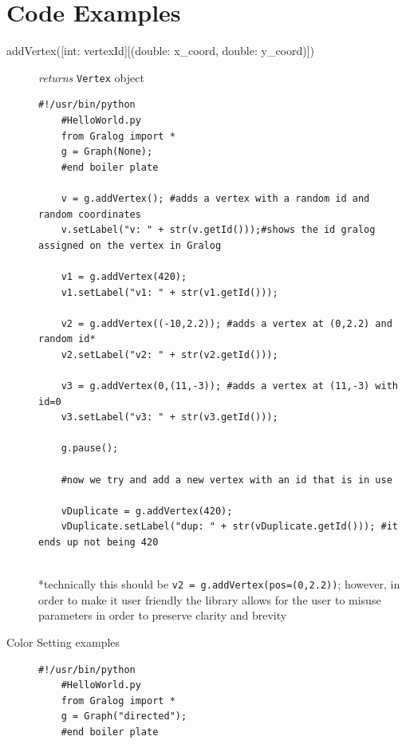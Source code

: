 \section{Code Examples}

\begin{description}
\item[addVertex({[int: vertexId]}{[(double: x\_coord, double: y\_coord)]})]\emph{returns}
  \texttt{Vertex} object


  \begin{example}
    \begin{lstlisting}[title={addVertex Example},label=addVertexExample]
    #!/usr/bin/python
    #HelloWorld.py
    from Gralog import *
    g = Graph(None);
    #end boiler plate
    
    v = g.addVertex(); #adds a vertex with a random id and random coordinates
    v.setLabel("v: " + str(v.getId()));#shows the id gralog assigned on the vertex in Gralog
    
    v1 = g.addVertex(420);
    v1.setLabel("v1: " + str(v1.getId()));
    
    v2 = g.addVertex((-10,2.2)); #adds a vertex at (0,2.2) and random id*
    v2.setLabel("v2: " + str(v2.getId()));
    
    v3 = g.addVertex(0,(11,-3)); #adds a vertex at (11,-3) with id=0
    v3.setLabel("v3: " + str(v3.getId()));
    
    g.pause();
    
    #now we try and add a new vertex with an id that is in use
    
    vDuplicate = g.addVertex(420);
    vDuplicate.setLabel("dup: " + str(vDuplicate.getId())); #it ends up not being 420
    
    \end{lstlisting}
    *technically this should be \texttt{v2 = g.addVertex(pos=(0,2.2))}; however, in order to make it user friendly the library allows for the user to misuse parameters in order to preserve clarity and brevity
  \end{example}

\item[Color Setting examples]


  \begin{example}
    \begin{lstlisting}[title={Color Setting Example},label=colorSettingExample]
    #!/usr/bin/python
    #HelloWorld.py
    from Gralog import *
    g = Graph("directed");
    #end boiler plate
    

\end{lstlisting}
\end{example}
\end{description}
